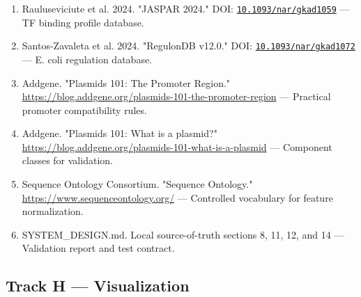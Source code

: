 \documentclass[11pt]{report}
\begin{document}
\begin{enumerate}
\item Rauluseviciute et al. 2024. "JASPAR 2024." DOI: \href{https://doi.org/10.1093/nar/gkad1059}{\nolinkurl{10.1093/nar/gkad1059}} — TF binding profile database.
\item Santos-Zavaleta et al. 2024. "RegulonDB v12.0." DOI: \href{https://doi.org/10.1093/nar/gkad1072}{\nolinkurl{10.1093/nar/gkad1072}} — E. coli regulation database.
\item Addgene. "Plasmids 101: The Promoter Region." \url{https://blog.addgene.org/plasmids-101-the-promoter-region} — Practical promoter compatibility rules.
\item Addgene. "Plasmids 101: What is a plasmid?" \url{https://blog.addgene.org/plasmids-101-what-is-a-plasmid} — Component classes for validation.
\item Sequence Ontology Consortium. "Sequence Ontology." \url{https://www.sequenceontology.org/} — Controlled vocabulary for feature normalization.
\item SYSTEM\_DESIGN.md. Local source-of-truth sections 8, 11, 12, and 14 — Validation report and test contract.
\end{enumerate}

\subsection{Track H — Visualization}
\end{document}
